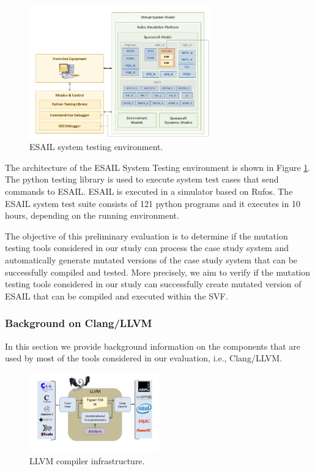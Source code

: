 \begin{figure}[h]
	\centering
    \includegraphics[width=0.7\textwidth]{images/esail}
    \caption{ESAIL system testing environment.}
    \label{fig:esail}
\end{figure}

The architecture of the ESAIL System Testing environment is shown in Figure \ref{fig:esail}. The python testing library is used to execute system test cases that send commands to ESAIL. ESAIL is executed in a simulator based on Rufos. The ESAIL system test suite consists of 121 python programs and it executes in 10 hours, depending on the running environment.

The objective of this preliminary evaluation is to determine if the mutation testing tools considered in our study can process the case study system and automatically generate mutated versions of the case study system that can be successfully compiled and tested. More precisely, we aim to verify if the mutation testing tools considered in our study can successfully create mutated version of ESAIL that can be compiled and executed within the SVF.

\subsubsection{Background on Clang/LLVM}
\label{subsec:background}

In this section we provide background information on the components that are used by most of the tools considered in our evaluation, i.e., Clang/LLVM.


\begin{figure}[h]
	\centering
    \includegraphics[width=0.5\textwidth]{images/llvm}
    \caption{LLVM compiler infrastructure.}
    \label{fig:llvm}
\end{figure}

